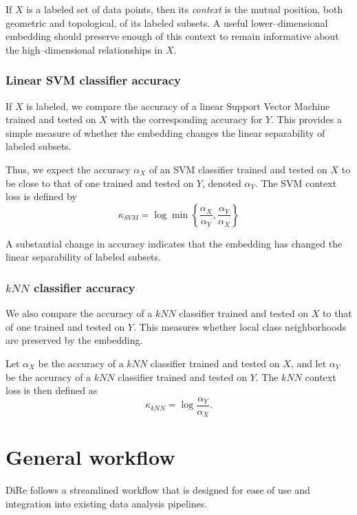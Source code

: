 \documentclass[11pt]{article}
\begin{document}
If $X$ is a labeled set of data points, then its \textit{context} is the mutual position, both geometric and topological, of its labeled subsets. A useful lower--dimensional embedding should preserve enough of this context to remain informative about the high--dimensional relationships in $X$.

\subsubsection{Linear SVM classifier accuracy}

If $X$ is labeled, we compare the accuracy of a linear Support Vector Machine trained and tested on $X$ with the corresponding accuracy for $Y$. This provides a simple measure of whether the embedding changes the linear separability of labeled subsets.

Thus, we expect the accuracy $\alpha_X$ of an SVM classifier trained and tested on $X$ to be close to that of one trained and tested on $Y$, denoted $\alpha_Y$. The SVM context loss is defined by
\[
\kappa_{SVM} = \log \min\left\{ \frac{\alpha_X}{\alpha_Y}, \frac{\alpha_Y}{\alpha_X} \right\}
\]

A substantial change in accuracy indicates that the embedding has changed the linear separability of labeled subsets.

\subsubsection{\texorpdfstring{$kNN$}{kNN} classifier accuracy}

We also compare the accuracy of a $kNN$ classifier trained and tested on $X$ to that of one trained and tested on $Y$. This measures whether local class neighborhoods are preserved by the embedding.

Let $\alpha_X$ be the accuracy of a $kNN$ classifier trained and tested on $X$, and let $\alpha_Y$ be the accuracy of a $kNN$ classifier trained and tested on $Y$. The $kNN$ context loss is then defined as 
\[
\kappa_{kNN} = \log \frac{\alpha_Y}{\alpha_X}.
\]


\section{General workflow}
DiRe follows a streamlined workflow that is designed for ease of use and integration into existing data analysis pipelines.
\end{document}
